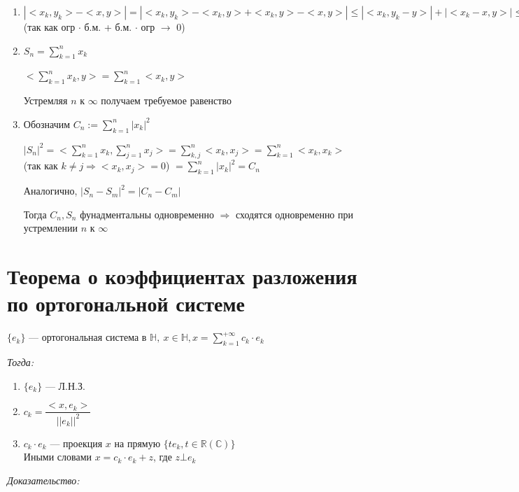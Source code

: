 \documentclass[paper=a4, fontsize=17pt]{article}
\begin{document}
\begin{enumerate}
	\item $|<x_k, y_k> - <x, y>| = |<x_k, y_k> - <x_k, y> + <x_k, y> - <x, y>| \leqslant |<x_k, y_k - y>| + |<x_k - x, y>| \leqslant |x_k| \cdot |y_k - y| + |x_k - x| \cdot |y| \rightarrow 0$ (так как огр $\cdot$ б.м. +  б.м. $\cdot$ огр $\rightarrow$ 0)
	
	\item $S_n = \sum\limits_{k = 1}^{n} x_k$
	
	$<\sum\limits_{k = 1}^n x_k, y> = \sum\limits_{k = 1}^n <x_k, y>$
	
	Устремляя $n$ к $\infty$ получаем требуемое равенство
	
	\item Обозначим $C_n := \sum\limits_{k = 1}^n |x_k|^2$
	
	 $|S_n|^2 = <\sum\limits_{k = 1}^n x_k, \sum\limits_{j = 1}^n x_j> = \sum\limits_{k, j}^n <x_k, x_j> = \sum\limits_{k = 1}^n <x_k, x_k>$ (так как $k \neq j \Rightarrow <x_k, x_j> = 0$) $= \sum\limits_{k = 1}^n |x_k|^2 = C_n$
	 
	 Аналогично, $|S_n - S_m|^2 = |C_n - C_m|$
	 
	 Тогда $C_n, S_n$ фунадментальны одновременно $\Rightarrow$ сходятся одновременно при устремлении $n$ к $\infty$
\end{enumerate}

\section{Теорема о коэффициентах разложения по ортогональной системе}

$\{e_k\}$ {{---}} ортогональная система в $\mathds{H},\ x \in \mathds{H}, x = \sum\limits_{k=1}^{+\infty} c_k \cdot e_k$

\emph{Тогда:}
\begin{enumerate}

	\item $\{e_k\}$ {{---}} Л.Н.З.
	
	\item $c_k = \dfrac{<x, e_k>}{||e_k||^2}$
	
	\item $c_k \cdot e_k$ {{---}} проекция $x$ на прямую $\{te_k, t \in \mathbb{R}(\mathbb{C})\}$\\ 
	Иными словами $x = c_k \cdot e_k + z$, где $z \bot e_k$

\end{enumerate}

\emph{Доказательство:}
\end{document}
